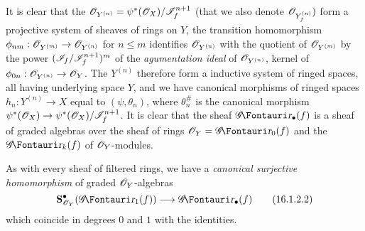 It is clear that the $\mathscr{O}_{Y^{(n)}} = \psi^*(\mathscr{O}_X)/\mathscr{I}_f^{n+1}$ (that we also denote $\mathscr{O}_{Y_f^{(n)}})$ form a
projective system of sheaves of rings on $Y$, the transition homomorphism $\phi_{nm}:\sh{O}_{Y^{(m)}} \to \sh{O}_{Y^{(n)}}$ for $n \leq m$ identifies $\mathscr{O}_{Y^{(n)}}$ with the quotient of $\mathscr{O}_{Y^{(m)}}$ by the power $(\mathscr{I}_f/\mathscr{I}_f^{n+1} )^m$ of the \emph{agumentation ideal} of $\mathscr{O}_{Y^{(n)}}$, kernel of $\phi_{0n}: \sh{O}_{Y^{(n)}} \to \sh{O}_{Y}$.
The $Y^{(n)}$ therefore form a inductive system of ringed spaces, all having underlying space $Y$, and we have canonical morphisms of ringed spaces $h_n: Y^{(n)} \to X$ equal to $(\psi, \theta_n)$, where $\theta^\#_n$ is the canonical morphism $\psi^*(\sh{O}_X) \to \psi^*(\sh{O}_X)/\sh{I}_f^{n+1}$.
It is clear that the sheaf $\shGr_\bullet(f)$ is a sheaf of graded algebras over the sheaf of rings $\sh{O}_Y = \shGr_0(f)$ and the $\shGr_k(f)$ of $\mathscr{O}_Y$-modules.

As with every sheaf of filtered rings, we have a \emph{canonical surjective homomorphism} of graded $\mathscr{O}_Y$-algebras
\[
  \label{IV.16.1.2.2}
  \bb{S}_{\sh{O}_Y}^\bullet(\shGr_1(f)) \to \shGr_\bullet(f)
  \tag{16.1.2.2}
\]
which coincide in degrees $0$ and $1$ with the identities.

